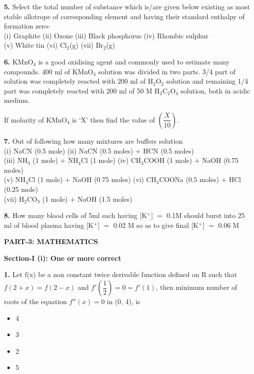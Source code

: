 \documentclass[10pt,twocolumn]{extarticle}
\newenvironment{qoptions}{\begin{itemize}[leftmargin=1.8em,itemsep=2pt,topsep=2pt,label={}]}{\end{itemize}}
\newcommand{\opt}[2]{\item[({#1})] {#2}}
\newcommand{\sectionhdr}[1]{\par\vspace{4pt}\noindent\textbf{\large #1}\par\vspace{2pt}}
\newcommand{\subsectionhdr}[1]{\par\vspace{3pt}\noindent\textbf{#1}\par\vspace{2pt}}
\begin{document}
\textbf{5.} Select the total number of substance which is/are given below existing as most stable allotrope of corresponding element and having their standard enthalpy of formation zero-\\
(i) Graphite \hspace{1em} (ii) Ozone \hspace{1em} (iii) Black phosphorus \hspace{1em} (iv) Rhombic sulphur\\
(v) White tin \hspace{1em} (vi) Cl$_2$(g) \hspace{1em} (vii) Br$_2$(g)

\textbf{6.} KMnO$_4$ is a good oxidising agent and commonly used to estimate many compounds. 400 ml of KMnO$_4$ solution was divided in two parts. 3/4 part of solution was completely reacted with 200 ml of H$_2$O$_2$ solution and remaining 1/4 part was completely reacted with 200 ml of 50 M H$_2$C$_2$O$_4$ solution, both in acidic medium.

If molarity of KMnO$_4$ is `X' then find the value of $\left(\dfrac{X}{10}\right)$.

\textbf{7.} Out of following how many mixtures are buffers solution\\
(i) NaCN (0.5 mole) \hspace{1em} (ii) NaCN (0.5 moles) $+$ HCN (0.5 moles)\\
(iii) NH$_3$ (1 mole) $+$ NH$_4$Cl (1 mole) \hspace{1em} (iv) CH$_3$COOH (1 mole) $+$ NaOH (0.75 moles)\\
(v) NH$_4$Cl (1 mole) $+$ NaOH (0.75 moles) \hspace{1em} (vi) CH$_3$COONa (0.5 moles) $+$ HCl (0.25 mole)\\
(vii) H$_2$CO$_3$ (1 mole) $+$ NaOH (1.5 moles)

\textbf{8.} How many blood cells of 5ml each having [K$^+$] $=$ 0.1M should burst into 25 ml of blood plasma having [K$^+$] $=$ 0.02 M so as to give final [K$^+$] $=$ 0.06 M

\sectionhdr{PART-3: MATHEMATICS}
\subsectionhdr{Section-I (i): One or more correct}

\textbf{1.} Let f(x) be a non constant twice derivable function defined on R such that $f(2+x)=f(2-x)$ and $f'\left(\dfrac12\right)=0=f'(1)$, then minimum number of roots of the equation $f''(x)=0$ in (0, 4), is

\begin{qoptions}
\opt{A}{4}
\opt{B}{3}
\opt{C}{2}
\opt{D}{5}
\end{qoptions}
\end{document}
